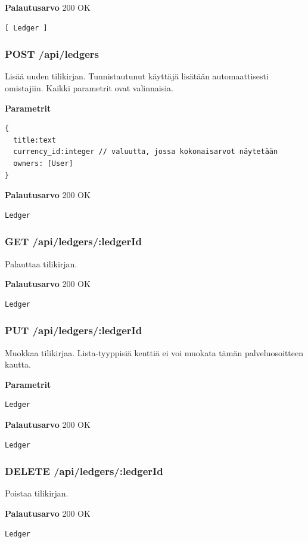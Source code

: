 \documentclass[a4paper,parskip=half]{scrartcl}
\begin{document}
\textbf{Palautusarvo}
200 OK
\begin{Verbatim}
[ Ledger ]
\end{Verbatim}

\subsubsection{POST /api/ledgers}
Lisää uuden tilikirjan. Tunnistautunut käyttäjä lisätään automaattisesti
omistajiin. Kaikki parametrit ovat valinnaisia.

\textbf{Parametrit}
\begin{Verbatim}
{
  title:text
  currency_id:integer // valuutta, jossa kokonaisarvot näytetään
  owners: [User]
}
\end{Verbatim}

\textbf{Palautusarvo}
200 OK
\begin{Verbatim}
Ledger
\end{Verbatim}

\subsubsection{GET /api/ledgers/:ledgerId}

Palauttaa tilikirjan.

\textbf{Palautusarvo}
200 OK
\begin{Verbatim}
Ledger
\end{Verbatim}

\subsubsection{PUT /api/ledgers/:ledgerId}

Muokkaa tilikirjaa. Lista-tyyppisiä kenttiä ei voi muokata tämän
palveluosoitteen kautta.

\textbf{Parametrit}
\begin{Verbatim}
Ledger
\end{Verbatim}

\textbf{Palautusarvo}
200 OK
\begin{Verbatim}
Ledger
\end{Verbatim}

\subsubsection{DELETE /api/ledgers/:ledgerId}

Poistaa tilikirjan.

\textbf{Palautusarvo}
200 OK
\begin{Verbatim}
Ledger
\end{Verbatim}
\end{document}
